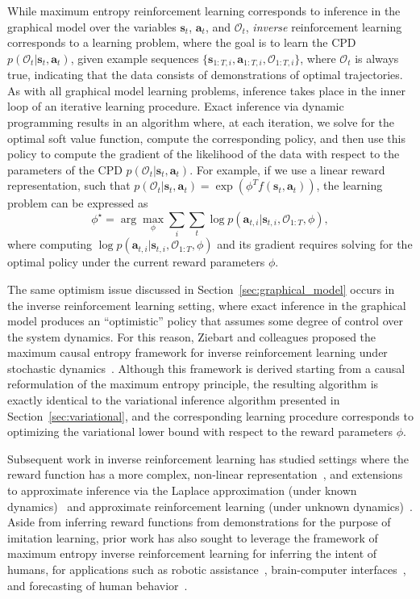 While maximum entropy reinforcement learning corresponds to inference in the graphical model over the variables $\mathbf{s}_t$, $\mathbf{a}_t$, and $\mathcal{O}_t$, \emph{inverse} reinforcement learning corresponds to a learning problem, where the goal is to learn the CPD $p(\mathcal{O}_t|\mathbf{s}_t,\mathbf{a}_t)$, given example sequences $\{\mathbf{s}_{1:T,i},\mathbf{a}_{1:T,i},\mathcal{O}_{1:T,i}\}$, where $\mathcal{O}_t$ is always true, indicating that the data consists of demonstrations of optimal trajectories. As with all graphical model learning problems, inference takes place in the inner loop of an iterative learning procedure. Exact inference via dynamic programming results in an algorithm where, at each iteration, we solve for the optimal soft value function, compute the corresponding policy, and then use this policy to compute the gradient of the likelihood of the data with respect to the parameters of the CPD $p(\mathcal{O}_t|\mathbf{s}_t,\mathbf{a}_t)$. For example, if we use a linear reward representation, such that $p(\mathcal{O}_t|\mathbf{s}_t,\mathbf{a}_t) = \exp(\phi^T f(\mathbf{s}_t,\mathbf{a}_t))$, the learning problem can be expressed as
\[
\phi^\star = \arg\max_\phi \sum_i \sum_t \log p(\mathbf{a}_{t,i} | \mathbf{s}_{t,i}, \mathcal{O}_{1:T}, \phi),
\]
where computing $\log p(\mathbf{a}_{t,i} | \mathbf{s}_{t,i}, \mathcal{O}_{1:T}, \phi)$ and its gradient requires solving for the optimal policy under the current reward parameters $\phi$.

The same optimism issue discussed in Section~\ref{sec:graphical_model} occurs in the inverse reinforcement learning setting, where exact inference in the graphical model produces an ``optimistic'' policy that assumes some degree of control over the system dynamics. For this reason, Ziebart and colleagues proposed the maximum causal entropy framework for inverse reinforcement learning under stochastic dynamics~\citep{maxcausalent}. Although this framework is derived starting from a causal reformulation of the maximum entropy principle, the resulting algorithm is exactly identical to the variational inference algorithm presented in Section~\ref{sec:variational}, and the corresponding learning procedure corresponds to optimizing the variational lower bound with respect to the reward parameters $\phi$.

Subsequent work in inverse reinforcement learning has studied settings where the reward function has a more complex, non-linear representation~\citep{gpirl,maxentdeepirl}, and extensions to approximate inference via the Laplace approximation (under known dynamics)~\citep{localioc,legibility} and approximate reinforcement learning (under unknown dynamics)~\citep{gcl,airl}. Aside from inferring reward functions from demonstrations for the purpose of imitation learning, prior work has also sought to leverage the framework of maximum entropy inverse reinforcement learning for inferring the intent of humans, for applications such as robotic assistance~\citep{legibility}, brain-computer interfaces~\citep{Javdani}, and forecasting of human behavior~\citep{kitani1,kitani2}.

